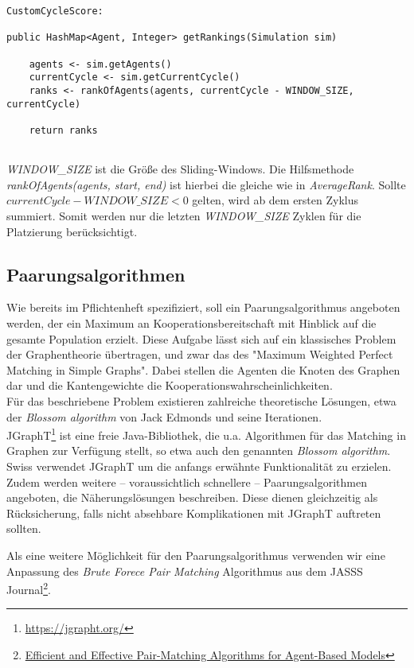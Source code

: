 \begin{lstlisting}
CustomCycleScore:

public HashMap<Agent, Integer> getRankings(Simulation sim) 
	
	agents <- sim.getAgents()
	currentCycle <- sim.getCurrentCycle()
	ranks <- rankOfAgents(agents, currentCycle - WINDOW_SIZE, currentCycle)
	
	return ranks
	
\end{lstlisting}
\emph{WINDOW\_SIZE} ist die Größe des Sliding-Windows. Die Hilfsmethode \emph{rankOfAgents(agents, start, end)} ist hierbei die gleiche wie in \emph{AverageRank}. Sollte $currentCycle - WINDOW\_SIZE < 0$ gelten, wird ab dem ersten Zyklus summiert. Somit werden nur die letzten \emph{WINDOW\_SIZE} Zyklen für die Platzierung berücksichtigt. 


\subsection{Paarungsalgorithmen}

Wie bereits im Pflichtenheft spezifiziert, soll ein Paarungsalgorithmus angeboten werden, der ein Maximum an Kooperationsbereitschaft mit Hinblick auf die gesamte Population erzielt. Diese Aufgabe lässt sich auf ein klassisches Problem der Graphentheorie übertragen, und zwar das des "Maximum Weighted Perfect Matching in Simple Graphs". Dabei stellen die Agenten die Knoten des Graphen dar und die Kantengewichte die Kooperationswahrscheinlichkeiten.\\
Für das beschriebene Problem existieren zahlreiche theoretische Lösungen, etwa der \emph{Blossom algorithm} von Jack Edmonds und seine Iterationen.\\
JGraphT\footnote{\href{https://jgrapht.org/}{https://jgrapht.org/}} ist eine freie Java-Bibliothek, die u.a. Algorithmen für das Matching in Graphen zur Verfügung stellt, so etwa auch den genannten \emph{Blossom algorithm}.\\
Swiss verwendet JGraphT um die anfangs erwähnte Funktionalität zu erzielen. Zudem werden weitere – voraussichtlich schnellere – Paarungsalgorithmen angeboten, die Näherungslösungen beschreiben. Diese dienen gleichzeitig als Rücksicherung, falls nicht absehbare Komplikationen mit JGraphT auftreten sollten.


Als eine weitere Möglichkeit für den Paarungsalgorithmus verwenden wir eine Anpassung des \emph{Brute Forece Pair Matching} Algorithmus aus dem JASSS Journal\footnote{\href{http://jasss.soc.surrey.ac.uk/20/4/8.html}{Efficient and Effective Pair-Matching Algorithms for Agent-Based Models}}.

